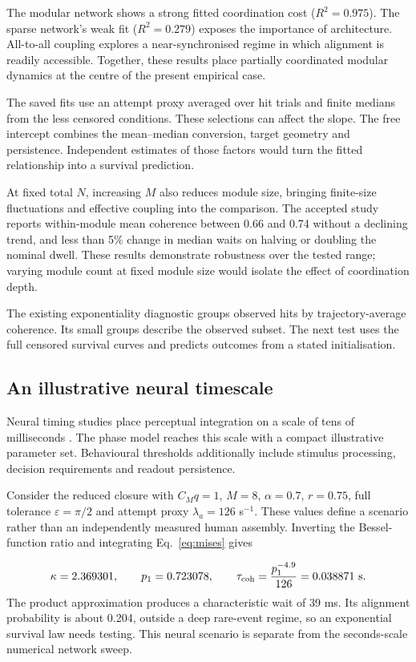 \documentclass[11pt]{article}
\begin{document}
The modular network shows a strong fitted coordination cost
($R^2=0.975$). The sparse network's weak fit ($R^2=0.279$) exposes the
importance of architecture. All-to-all coupling explores a
near-synchronised regime in which alignment is readily accessible.
Together, these results place partially coordinated modular dynamics at
the centre of the present empirical case.

The saved fits use an attempt proxy averaged over hit trials and finite
medians from the less censored conditions. These selections can affect
the slope. The free intercept combines the mean--median conversion,
target geometry and persistence. Independent estimates of those factors
would turn the fitted relationship into a survival prediction.

At fixed total $N$, increasing $M$ also reduces module size, bringing
finite-size fluctuations and effective coupling into the comparison.
The accepted study reports within-module mean coherence between 0.66 and
0.74 without a declining trend, and less than 5\% change in median waits
on halving or doubling the nominal dwell. These results demonstrate
robustness over the tested range; varying module count at fixed module
size would isolate the effect of coordination depth.

The existing exponentiality diagnostic groups observed hits by
trajectory-average coherence. Its small groups describe the observed
subset. The next test uses the full censored survival curves and predicts
outcomes from a stated initialisation.

\subsection{An illustrative neural timescale}

Neural timing studies place perceptual integration on a scale of tens of
milliseconds \cite{samaha2015,cecere2015,vanrullen2016}. The phase model
reaches this scale with a compact illustrative parameter set. Behavioural
thresholds additionally include stimulus processing, decision requirements
and readout persistence.

Consider the reduced closure with $C_Mq=1$, $M=8$,
$\alpha=0.7$, $r=0.75$, full tolerance $\varepsilon=\pi/2$ and
attempt proxy $\lambda_a=126$ s$^{-1}$. These values define a scenario
rather than an independently measured human assembly. Inverting the
Bessel-function ratio and integrating Eq.~\ref{eq:mises} gives

\begin{equation}
 \kappa=2.369301,\qquad p_1=0.723078,\qquad
 \tau_{\rm coh}=\frac{p_1^{-4.9}}{126}
              =0.038871\ {\rm s}.
 \label{eq:example}
\end{equation}
The product approximation produces a characteristic wait of 39 ms.
Its alignment probability is about 0.204, outside a deep rare-event
regime, so an exponential survival law needs testing. This neural
scenario is separate from the seconds-scale numerical network sweep.
\end{document}
